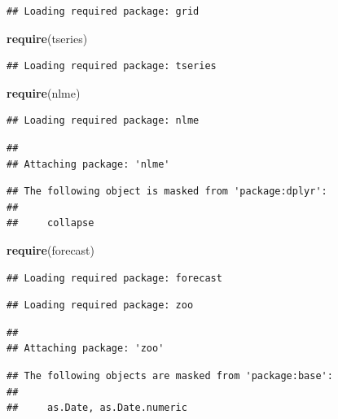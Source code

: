 \documentclass[]{article}
\newenvironment{Shaded}{\begin{snugshade}}{\end{snugshade}}
\newcommand{\KeywordTok}[1]{\textcolor[rgb]{0.13,0.29,0.53}{\textbf{{#1}}}}
\newcommand{\NormalTok}[1]{{#1}}
\begin{document}
\begin{verbatim}
## Loading required package: grid
\end{verbatim}

\begin{Shaded}
\begin{Highlighting}[]
\KeywordTok{require}\NormalTok{(tseries)}
\end{Highlighting}
\end{Shaded}

\begin{verbatim}
## Loading required package: tseries
\end{verbatim}

\begin{Shaded}
\begin{Highlighting}[]
\KeywordTok{require}\NormalTok{(nlme)}
\end{Highlighting}
\end{Shaded}

\begin{verbatim}
## Loading required package: nlme
\end{verbatim}

\begin{verbatim}
## 
## Attaching package: 'nlme'
\end{verbatim}

\begin{verbatim}
## The following object is masked from 'package:dplyr':
## 
##     collapse
\end{verbatim}

\begin{Shaded}
\begin{Highlighting}[]
\KeywordTok{require}\NormalTok{(forecast)}
\end{Highlighting}
\end{Shaded}

\begin{verbatim}
## Loading required package: forecast
\end{verbatim}

\begin{verbatim}
## Loading required package: zoo
\end{verbatim}

\begin{verbatim}
## 
## Attaching package: 'zoo'
\end{verbatim}

\begin{verbatim}
## The following objects are masked from 'package:base':
## 
##     as.Date, as.Date.numeric
\end{verbatim}
\end{document}
